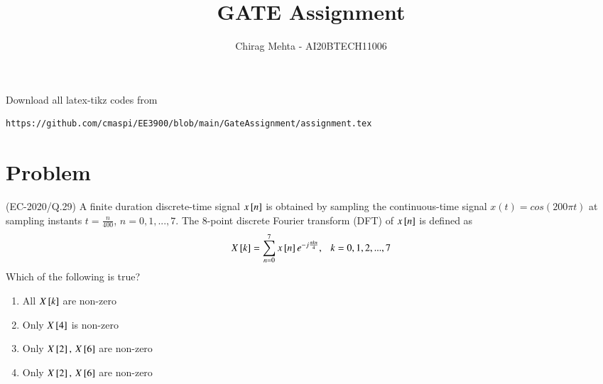 \documentclass[journal,12pt,twocolumn]{IEEEtran}
\begin{document}
     \def\rightbox#1{\makebox[0in][r]{#1}}
     \def\centbox#1{\makebox[0in]{#1}}
     \def\topbox#1{\raisebox{-\baselineskip}[0in][0in]{#1}}
     \def\midbox#1{\raisebox{-0.5\baselineskip}[0in][0in]{#1}}
\vspace{3cm}
\title{GATE Assignment}
\author{Chirag Mehta - AI20BTECH11006}
\maketitle
\newpage
\bigskip
\renewcommand{\thefigure}{\theenumi}
\renewcommand{\thetable}{\theenumi}
Download all latex-tikz codes from 
\begin{lstlisting}
https://github.com/cmaspi/EE3900/blob/main/GateAssignment/assignment.tex
\end{lstlisting}
\section{Problem}
(EC-2020/Q.29) A finite duration discrete-time signal $x{}\left[n\right]$ is obtained by sampling the continuous-time signal $x(t)= cos(200\pi t)$ at sampling instants $t=\frac{n}{400}$, $n=0,1,...,7.$ The 8-point discrete Fourier transform (DFT) of $x{}\left[n\right]$ is defined as
\begin{align}
    X{}\left[k\right]=\displaystyle \sum_{n=0}^7 x{}\left[n\right]e^{-j\frac{\pi kn}{4}},\ \ \ k=0,1,2,...,7
\end{align}
 Which of the following is true?
\begin{enumerate}
    \item All $X{}\left[k\right] $ are non-zero
    \item Only $X{}\left[4\right]$ is non-zero
    \item Only $X{}\left[2\right],\, X{}\left[6\right]$ are non-zero
    \item Only $X{}\left[2\right],\, X{}\left[6\right]$ are non-zero
\end{enumerate}
\end{document}
